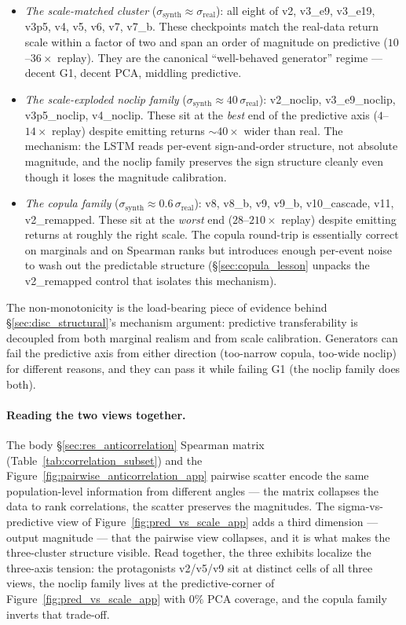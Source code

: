 \documentclass[journal]{IEEEtran}
\theoremstyle{definition}   %
\begin{document}
\begin{itemize}
    \item \emph{The scale-matched cluster}
    ($\sigma_{\text{synth}} \approx \sigma_{\text{real}}$): all
    eight of v2, v3\_e9, v3\_e19, v3p5, v4, v5, v6, v7, v7\_b.
    These checkpoints match the real-data return scale within
    a factor of two and span an order of magnitude on predictive
    ($10$--$36\times$ replay). They are the canonical
    ``well-behaved generator'' regime --- decent G1, decent PCA,
    middling predictive.
    \item \emph{The scale-exploded noclip family}
    ($\sigma_{\text{synth}} \approx 40\,\sigma_{\text{real}}$):
    v2\_noclip, v3\_e9\_noclip, v3p5\_noclip, v4\_noclip. These
    sit at the \emph{best} end of the predictive axis
    ($4$--$14\times$ replay) despite emitting returns
    $\sim 40\times$ wider than real. The mechanism: the LSTM reads
    per-event sign-and-order structure, not absolute magnitude,
    and the noclip family preserves the sign structure cleanly even
    though it loses the magnitude calibration.
    \item \emph{The copula family}
    ($\sigma_{\text{synth}} \approx 0.6\,\sigma_{\text{real}}$):
    v8, v8\_b, v9, v9\_b, v10\_cascade, v11, v2\_remapped.
    These sit at the \emph{worst} end ($28$--$210\times$ replay)
    despite emitting returns at roughly the right scale. The
    copula round-trip is essentially correct on marginals and on
    Spearman ranks but introduces enough per-event noise to
    wash out the predictable structure
    (\S\ref{sec:copula_lesson} unpacks the v2\_remapped control
    that isolates this mechanism).
\end{itemize}

The non-monotonicity is the load-bearing piece of evidence
behind \S\ref{sec:disc_structural}'s mechanism argument:
predictive transferability is decoupled from both marginal
realism and from scale calibration. Generators can fail the
predictive axis from either direction (too-narrow copula,
too-wide noclip) for different reasons, and they can pass it
while failing G1 (the noclip family does both).

\paragraph{Reading the two views together.}
The body \S\ref{sec:res_anticorrelation} Spearman matrix
(Table~\ref{tab:correlation_subset}) and the
Figure~\ref{fig:pairwise_anticorrelation_app} pairwise scatter
encode the same population-level information from different
angles --- the matrix collapses the data to rank correlations,
the scatter preserves the magnitudes. The
sigma-vs-predictive view of Figure~\ref{fig:pred_vs_scale_app}
adds a third dimension --- output magnitude --- that the
pairwise view collapses, and it is what makes the three-cluster
structure visible. Read together, the three exhibits localize
the three-axis tension: the protagonists v2/v5/v9 sit at
distinct cells of all three views, the noclip family lives at
the predictive-corner of Figure~\ref{fig:pred_vs_scale_app}
with $0\%$ PCA coverage, and the copula family inverts that
trade-off.
\end{document}
